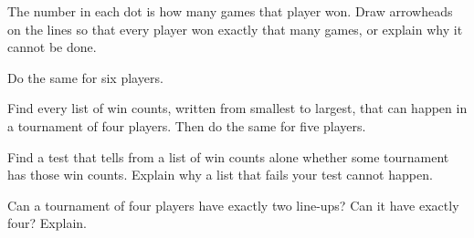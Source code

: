 \documentclass[12pt]{article}
\begin{document}
\newpage
\prob The number in each dot is how many games that player won. Draw arrowheads on the lines so that every player won exactly that many games, or explain why it cannot be done.

\vspace{0.5cm}
\begin{center}
\hspace{0.8cm}\hspace{0.8cm}

\vspace{1.0cm}
\hspace{0.8cm}
\end{center}

\newpage
\prob Do the same for six players.

\vspace{0.5cm}
\begin{center}
\hspace{1.6cm}

\vspace{0.9cm}
\hspace{1.6cm}
\end{center}

\newpage
\prob Find every list of win counts, written from smallest to largest, that can happen in a tournament of four players. Then do the same for five players.

\vspace{0.5cm}
\noindent{}\hfill{}\hfill{}\hfill{}\hfill{}

\vspace{0.7cm}
\noindent{}\hfill{}\hfill{}\hfill{}

\vspace{0.9cm}
\noindent{}\hfill{}\hfill{}\hfill{}

\vspace{0.9cm}
\noindent{}\hfill{}\hfill{}\hfill{}

\newpage
\prob Find a test that tells from a list of win counts alone whether some tournament has those win counts. Explain why a list that fails your test cannot happen.

\vspace{8.5cm}
\prob Can a tournament of four players have exactly two line-ups? Can it have exactly four? Explain.
\end{document}
